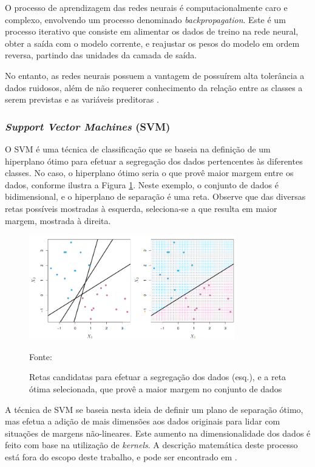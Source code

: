 O processo de aprendizagem das redes neurais é computacionalmente caro e complexo, envolvendo um processo denominado \textit{backpropagation}. Este é um processo iterativo que consiste em alimentar os dados de treino na rede neural, obter a saída com o modelo corrente, e reajustar os pesos do modelo em ordem reversa, partindo das unidades da camada de saída.

No entanto, as redes neurais possuem a vantagem de possuírem alta tolerância a dados ruidosos, além de não requerer conhecimento da relação entre as classes a serem previstas e as variáveis preditoras \cite{han2005}.

\subsubsection{\textit{Support Vector Machines} (SVM)}
O SVM é uma técnica de classificação que se baseia na definição de um hiperplano ótimo para efetuar a segregação dos dados pertencentes às diferentes classes. No caso, o hiperplano ótimo seria o que provê maior margem entre os dados, conforme ilustra a Figura \ref{fig:svm_max_margin}. Neste exemplo, o conjunto de dados é bidimensional, e o hiperplano de separação é uma reta. Observe que das diversas retas possíveis mostradas à esquerda, seleciona-se a que resulta em maior margem, mostrada à direita.

\begin{figure}[h]
	\centering
	\caption{Retas candidatas para efetuar a segregação dos dados (esq.), e a reta ótima selecionada, que provê a maior margem no conjunto de dados}
  \includegraphics[width=0.8\textwidth]{imagens/svm_max_margin.png}
  \label{fig:svm_max_margin}  
  
  Fonte: \cite{james2014}
\end{figure}

A técnica de SVM se baseia nesta ideia de definir um plano de separação ótimo, mas efetua a adição de mais dimensões aos dados originais para lidar com situações de margens não-lineares. Este aumento na dimensionalidade dos dados é feito com base na utilização de \textit{kernels}. A descrição matemática deste processo está fora do escopo deste trabalho, e pode ser encontrado em \cite{james2014}.

